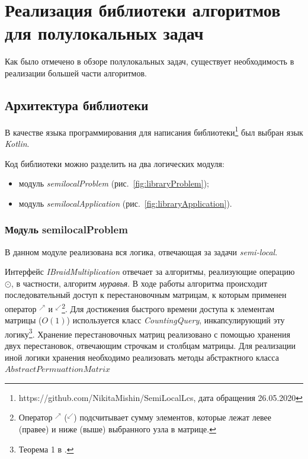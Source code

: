 \section{Реализация библиотеки алгоритмов для полулокальных задач}\label{librarySection}
Как было отмечено в обзоре полулокальных задач,
существует необходимость в реализации большей части алгоритмов.


\subsection{Архитектура библиотеки}
В качестве языка программирования для написания библиотеки\footnote{https://github.com/NikitaMishin/SemiLocalLcs, дата обращения 26.05.2020} был выбран язык \emph{Kotlin}.


Код библиотеки можно  разделить на два логических модуля:
\begin{itemize}
    \item модуль \emph{semilocalProblem}  (рис.~\ref{fig:libraryProblem});
    \item модуль \emph{semilocalApplication} (рис.~\ref{fig:libraryApplication}).
\end{itemize}



\subsubsection{Модуль semilocalProblem}
В данном модуле реализована вся логика, отвечающая за задачи \emph{semi-local}.

Интерфейс \emph{IBraidMultiplication} отвечает за алгоритмы, реализующие операцию $\odot$, в частности, алгоритм \emph{муравья}.
В ходе работы алгоритма происходит последовательный доступ к перестановочным матрицам, к которым применен оператор $^{\nearrow}$ и $^{\swarrow}$\footnote{Оператор $^{\nearrow}$ ($^{\swarrow}$)  подсчитывает сумму элементов, которые лежат левее (правее) и ниже (выше) выбранного узла в матрице.}.
Для достижения быстрого времени доступа к элементам  матрицы ($O(1)$) используется
класс \emph{CountingQuery}, инкапсулирующий эту логику\footnote{Теорема 1 в \cite{tiskin2015fast}.}.
% 
Хранение перестановочных матриц реализовано с помощью хранения двух перестановок, отвечающим строчкам и столбцам матрицы.
Для реализации иной логики хранения необходимо реализовать методы абстрактного класса $AbstractPermuattionMatrix$

